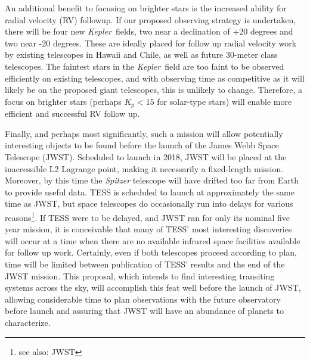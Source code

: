 \documentclass[12pt, preprint]{aastex}
\newcommand{\observatory}[1]{\textsl{#1}}
\newcommand{\kepler}{\observatory{Kepler}}
\newcommand{\Kepler}{\kepler}
\begin{document}
An additional benefit to focusing on brighter stars is the increased ability 
 for radial velocity (RV) followup. 
If our proposed observing strategy is undertaken, there will
 be four new \Kepler\ fields, two near a declination of +20 degrees and two 
 near -20 degrees. 
These are ideally placed for follow up radial velocity work
 by existing telescopes in Hawaii and Chile, as well as future 30-meter class
 telescopes. 
The faintest stars in the \Kepler\ field are too faint to be observed 
 efficiently on existing telescopes, and with observing time as competitive 
 as it will likely be on the proposed giant telescopes, this is unlikely to 
 change.
Therefore, a focus on brighter stars (perhaps $K_p < 15$ for solar-type stars) 
 will enable more efficient and successful RV follow up.
 
Finally, and perhaps most significantly, such a mission will allow potentially 
 interesting objects to be found before the launch of the James Webb Space 
 Telescope (JWST). 
Scheduled to launch in 2018, JWST will be placed at 
 the inaccessible L2 Lagrange point, making it necessarily a fixed-length 
 mission. 
Moreover, by this time the \textit{Spitzer} telescope will have drifted too 
 far from Earth to provide useful data.
TESS is scheduled to launch at approximately the same time as JWST, but 
 space telescopes do occasionally run into delays for various reasons\footnote{see also: JWST}.
If TESS were to be delayed, and JWST ran for only its nominal five year 
 mission, it is conceivable that many of TESS' most interesting discoveries 
 will occur at a time when there are no available infrared space facilities 
 available for follow up work.
Certainly, even if both telescopes proceed according to plan, time will be 
 limited between publication of TESS' results and the end of the JWST mission.
This proposal, which intends to find interesting transiting systems across 
 the sky, will accomplish this feat well before the launch of JWST, allowing 
 considerable time to plan observations with the future observatory before 
 launch and assuring that JWST will have an abundance of planets to 
 characterize.
\end{document}
